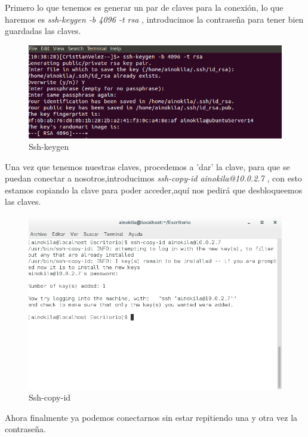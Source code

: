 Primero lo que tenemos es generar un par de claves para la conexión, lo que haremos es \textit{ssh-keygen -b 4096 -t rsa} , introducimos la contraseña para tener bien guardadas las claves.

	\begin{figure}[H]
	\centering
	\includegraphics[scale=0.35]{pics/ssh_gen.png}  
	\caption{Ssh-keygen} \label{fig:ssh_keygen}
	\end{figure}

Una vez que tenemos nuestras claves, procedemos a 'dar' la clave, para que se puedan conectar a nosotros,introducimos \textit{ssh-copy-id ainokila@10.0.2.7} , con esto estamos copiando la clave para poder acceder,aquí nos pedirá que desbloqueemos las claves.

	\begin{figure}[H]
	\centering
	\includegraphics[scale=0.35]{pics/ssh_copy.png}  
	\caption{Ssh-copy-id} \label{fig:ssh_copy}
\end{figure}

Ahora finalmente ya podemos conectarnos sin estar repitiendo una y otra vez la contraseña. \cite{key}

